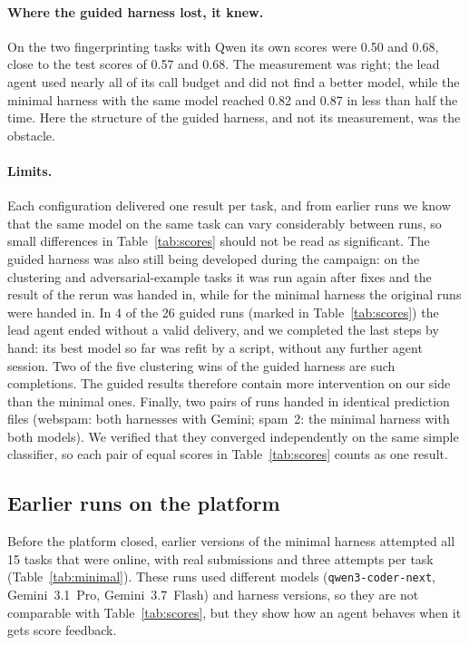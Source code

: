 \documentclass[letterpaper,twocolumn,10pt]{article}
\begin{document}
\paragraph{Where the guided harness lost, it knew.} On the two
fingerprinting tasks with Qwen its own scores were 0.50 and 0.68, close to the
test scores of 0.57 and 0.68. The measurement was right; the lead agent
used nearly all of its call budget and did not find a better model, while
the minimal harness with the same model reached 0.82 and 0.87 in less than
half the time. Here the structure of the guided harness, and not its measurement,
was the obstacle.

\paragraph{Limits.} Each configuration delivered one result per task, and
from earlier runs we know that the same model on the same task can vary
considerably between runs, so small differences in Table~\ref{tab:scores}
should not be read as significant. The guided harness was also still being
developed during the campaign: on the clustering and adversarial-example
tasks it was run again after fixes and the result of the rerun was handed
in, while for the minimal harness the original runs were handed in. In 4
of the 26 guided runs (marked in Table~\ref{tab:scores}) the lead agent
ended without a valid delivery, and we completed the last steps by hand:
its best model so far was refit by a script, without any further agent
session. Two of the five clustering wins of the guided harness are such
completions. The guided results therefore contain more intervention on our
side than the minimal ones. Finally, two pairs of runs handed in identical
prediction files (webspam: both harnesses with Gemini; spam~2: the minimal harness with both
models).
We verified that they converged independently on the same simple
classifier, so each pair of equal scores in Table~\ref{tab:scores} counts as
one result.

\subsection{Earlier runs on the platform}

Before the platform closed, earlier versions of the minimal harness attempted
all 15 tasks that were online, with real submissions and three attempts per
task (Table~\ref{tab:minimal}). These runs used different models
(\texttt{qwen3-coder-next}, Gemini~3.1~Pro, Gemini~3.7~Flash) and harness
versions, so they are not comparable with Table~\ref{tab:scores}, but they
show how an agent behaves when it gets score feedback.
\end{document}
